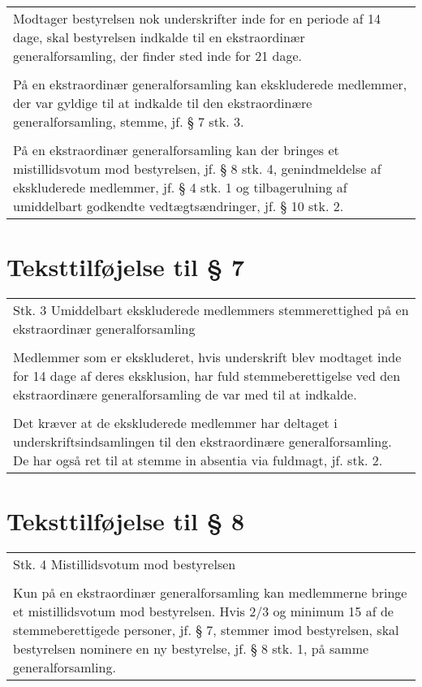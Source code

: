 \documentclass[a4paper,11pt]{report}
\newenvironment{quotationb}%
{\begin{tabular}{|p{10cm}}}%
{\\\end{tabular}}
\begin{document}
\begin{appendices}
\begin{quotationb}
Modtager bestyrelsen nok underskrifter inde for en periode af 14 dage, skal
bestyrelsen indkalde til en ekstraordinær generalforsamling, der finder sted
inde for 21 dage.\\
\\
På en ekstraordinær generalforsamling kan ekskluderede medlemmer, der var
gyldige til at indkalde til den ekstraordinære generalforsamling, stemme,
jf. § 7 stk. 3.\\
\\
På en ekstraordinær generalforsamling kan der bringes et mistillidsvotum mod
bestyrelsen, jf. § 8 stk. 4, genindmeldelse af ekskluderede medlemmer, jf. § 4
stk. 1 og tilbagerulning af umiddelbart godkendte vedtægtsændringer,
jf. § 10 stk. 2.
\end{quotationb}

\section*{Teksttilføjelse til § 7}

\begin{quotationb}
Stk. 3 Umiddelbart ekskluderede medlemmers stemmerettighed på en ekstraordinær
generalforsamling\\
\\
Medlemmer som er ekskluderet, hvis underskrift blev modtaget inde for 14
dage af deres eksklusion, har fuld stemmeberettigelse ved den ekstraordinære
generalforsamling de var med til at indkalde.\\
\\
Det kræver at de ekskluderede medlemmer har deltaget i underskriftsindsamlingen
til den ekstraordinære generalforsamling.  De har også ret til at stemme in
absentia via fuldmagt, jf. stk. 2.
\end{quotationb}

\section*{Teksttilføjelse til § 8}

\begin{quotationb}
Stk. 4 Mistillidsvotum mod bestyrelsen\\
\\
Kun på en ekstraordinær generalforsamling kan medlemmerne bringe et
mistillidsvotum mod bestyrelsen.  Hvis 2/3 og minimum 15 af de stemmeberettigede
personer, jf. § 7, stemmer imod bestyrelsen, skal bestyrelsen nominere
en ny bestyrelse, jf. § 8 stk. 1, på samme generalforsamling.
\end{quotationb}


\end{appendices}
\end{document}
